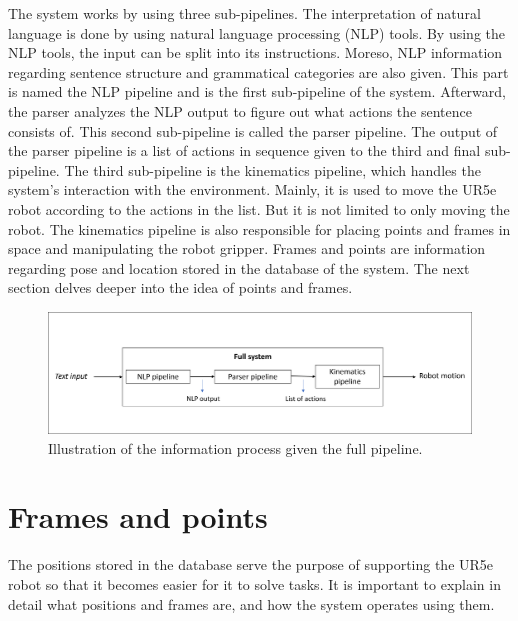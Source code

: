 The system works by using three sub-pipelines.
The interpretation of natural language is done by using natural language processing (NLP) tools. By using the NLP tools, the input can be split into its instructions. Moreso, NLP information regarding sentence structure and grammatical categories are also given. This part is named the NLP pipeline and is the first sub-pipeline of the system. Afterward, the parser analyzes the NLP output to figure out what actions the sentence consists of. This second sub-pipeline is called the parser pipeline. The output of the parser pipeline is a list of actions in sequence given to the third and final sub-pipeline. The third sub-pipeline is the kinematics pipeline, which handles the system's interaction with the environment. Mainly, it is used to move the UR5e robot according to the actions in the list. But it is not limited to only moving the robot. The kinematics pipeline is also responsible for placing points and frames in space and manipulating the robot gripper. Frames and points are information regarding pose and location stored in the database of the system. The next section delves deeper into the idea of points and frames.
\begin{figure}[ht]
    \centering
    \includegraphics[width=13cm]{img/Full_pipeline_data_IN_OUT.png}
    \caption{Illustration of the information process given the full pipeline.}
    \label{fig:Full_pipeline_data_IN_OUT}
\end{figure}


\section{Frames and points}\label{sec:sys_overview_frames_points}
The positions stored in the database serve the purpose of supporting the UR5e robot so that it becomes easier for it to solve tasks. It is important to explain in detail what positions and frames are, and how the system operates using them. 

